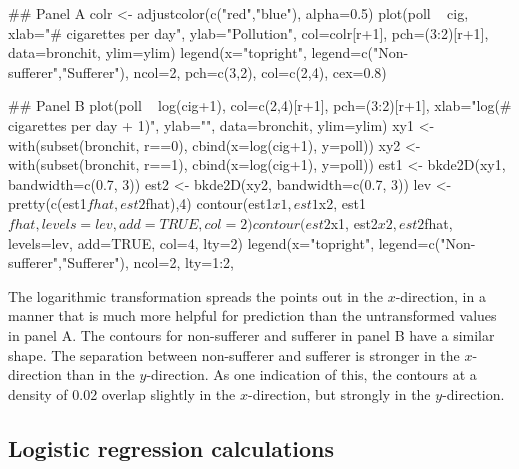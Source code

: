 \documentclass{tufte-book}\usepackage[]{graphicx}\usepackage[]{color}
\begin{document}
\begin{Schunk}
\begin{Sinput}
## Panel A
colr <- adjustcolor(c("red","blue"), alpha=0.5)
plot(poll ~ cig,
     xlab="# cigarettes per day", ylab="Pollution",
     col=colr[r+1], pch=(3:2)[r+1], data=bronchit,
     ylim=ylim)
legend(x="topright",
       legend=c("Non-sufferer","Sufferer"),
       ncol=2, pch=c(3,2), col=c(2,4), cex=0.8)
\end{Sinput}
\end{Schunk}


\begin{fullwidth}
\begin{Schunk}
\begin{Sinput}
## Panel B
plot(poll ~ log(cig+1), col=c(2,4)[r+1], pch=(3:2)[r+1],
     xlab="log(# cigarettes per day + 1)", ylab="", data=bronchit, ylim=ylim)
xy1 <- with(subset(bronchit, r==0), cbind(x=log(cig+1), y=poll))
xy2 <- with(subset(bronchit, r==1), cbind(x=log(cig+1), y=poll))
est1 <- bkde2D(xy1, bandwidth=c(0.7, 3))
est2 <- bkde2D(xy2, bandwidth=c(0.7, 3))
lev <- pretty(c(est1$fhat, est2$fhat),4)
contour(est1$x1, est1$x2, est1$fhat, levels=lev, add=TRUE, col=2)
contour(est2$x1, est2$x2, est2$fhat, levels=lev, add=TRUE, col=4, lty=2)
legend(x="topright", legend=c("Non-sufferer","Sufferer"), ncol=2, lty=1:2,
\end{Sinput}
\end{Schunk}
\end{fullwidth}

The logarithmic transformation spreads the points out in the
$x$-direction, in a manner that is much more helpful for prediction
than the untransformed values in panel A.  The contours for
non-sufferer and sufferer in panel B have a similar shape.  The
separation between non-sufferer and sufferer is stronger in the
$x$-direction than in the $y$-direction.  As one indication of this,
the contours at a density of 0.02 overlap slightly in the $x$-direction,
but strongly in the $y$-direction.

\subsection*{Logistic regression calculations}
\end{document}
